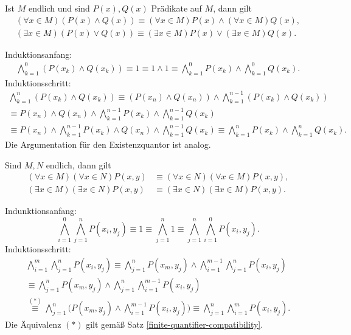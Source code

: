 \newpage
\begin{Satz}[Verträglichkeitsgesetze]%
\label{finite-quantifier-compatibility}
Ist $M$ endlich und sind $P(x),Q(x)$ Prädikate auf $M$, dann gilt
\begin{align*}
(\forall x\in M)(P(x)\land Q(x)) \equiv (\forall x\in M)P(x)\land(\forall x\in M)Q(x),\\
(\exists x\in M)(P(x)\lor Q(x)) \equiv (\exists x\in M)P(x)\lor(\exists x\in M)Q(x).
\end{align*}
\end{Satz}
 Induktionsanfang:
\begin{gather*}
\bigwedge_{k=1}^0 (P(x_k)\land Q(x_k)) \equiv 1 \equiv 1\land 1
\equiv \bigwedge_{k=1}^0 P(x_k)\land\bigwedge_{k=1}^0 Q(x_k).
\end{gather*}
Induktionsschritt:
\begin{gather*}
\bigwedge_{k=1}^n (P(x_k)\land Q(x_k))
\equiv (P(x_n)\land Q(x_n))\land\bigwedge_{k=1}^{n-1} (P(x_k)\land Q(x_k))\\
\equiv P(x_n)\land Q(x_n)\land\bigwedge_{k=1}^{n-1} P(x_k)\land\bigwedge_{k=1}^{n-1} Q(x_k)\\
\equiv P(x_n)\land\bigwedge_{k=1}^{n-1} P(x_k)\land Q(x_n)\land\bigwedge_{k=1}^{n-1} Q(x_k)
\equiv \bigwedge_{k=1}^n P(x_k)\land\bigwedge_{k=1}^n Q(x_k).
\end{gather*}
Die Argumentation für den Existenzquantor ist analog.\;\qedsymbol

\begin{Satz}
Sind $M,N$ endlich, dann gilt
\begin{align*}
(\forall x\in M)(\forall x\in N)P(x,y)&\equiv (\forall x\in N)(\forall x\in M)P(x,y),\\
(\exists x\in M)(\exists x\in N)P(x,y)&\equiv (\exists x\in N)(\exists x\in M)P(x,y).
\end{align*}
\end{Satz}
Indunktionsanfang:
\[\bigwedge_{i=1}^0\bigwedge_{j=1}^n P(x_i,y_j)
\equiv 1 \equiv \bigwedge_{j=1}^n 1 \equiv
\bigwedge_{j=1}^n\bigwedge_{i=1}^0 P(x_i,y_j).\]
Induktionsschritt:
\begin{gather*}
\bigwedge_{i=1}^m\bigwedge_{j=1}^n P(x_i,y_j)
\equiv \bigwedge_{j=1}^n P(x_m,y_j)\land\bigwedge_{i=1}^{m-1}\bigwedge_{j=1}^n P(x_i,y_j)\\
\equiv \bigwedge_{j=1}^n P(x_m,y_j)\land\bigwedge_{j=1}^n \bigwedge_{i=1}^{m-1} P(x_i,y_j)\\
\stackrel{(*)}\equiv \bigwedge_{j=1}^n \bigg(P(x_m,y_j)\land\bigwedge_{i=1}^{m-1} P(x_i,y_j)\bigg)
\equiv \bigwedge_{j=1}^n \bigwedge_{i=1}^m P(x_i,y_j).
\end{gather*}
Die Äquivalenz $(*)$ gilt gemäß Satz \ref{finite-quantifier-compatibility}.

